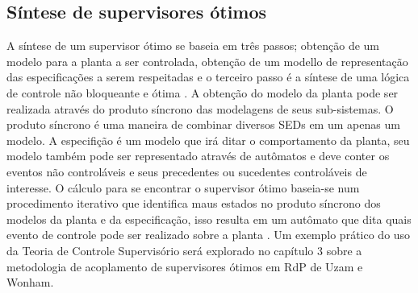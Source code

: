 \subsection{S\'intese de supervisores \'otimos}
A s\'intese de um supervisor \'otimo se baseia em tr\^es passos; obten\c{c}\~ao de um modelo para a planta a ser controlada, obten\c{c}\~ao de um modello de representa\c{c}\~ao das especifica\c{c}\~oes a serem respeitadas e o terceiro passo \'e a s\'intese de uma l\'ogica de controle n\~ao bloqueante e \'otima \cite{apostilacury}.
A obten\c{c}\~ao do modelo da planta pode ser realizada atrav\'es do produto s\'incrono das modelagens de seus sub-sistemas. O produto s\'incrono \'e uma maneira de combinar diversos SEDs em um apenas um modelo. A especifi\c{c}\~ao \'e um modelo que ir\'a ditar o comportamento da planta, seu modelo tamb\'em pode ser representado atrav\'es de aut\^omatos e deve conter os eventos n\~ao control\'aveis e seus precedentes ou sucedentes control\'aveis de interesse. 
O c\'alculo para se encontrar o supervisor \'otimo baseia-se num procedimento iterativo que identifica maus estados no produto s\'incrono dos modelos da planta e da especifica\c{c}\~ao, isso resulta em um aut\^omato que dita quais evento de controle pode ser realizado sobre a planta \cite{apostilacury}. Um exemplo pr\'atico do uso da Teoria de Controle Supervis\'orio ser\'a explorado no cap\'itulo 3 sobre a metodologia de acoplamento de supervisores \'otimos em RdP de Uzam e Wonham.

